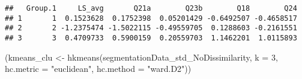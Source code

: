 \documentclass[
]{article}
\newenvironment{Shaded}{\begin{snugshade}}{\end{snugshade}}
\newcommand{\AttributeTok}[1]{\textcolor[rgb]{0.77,0.63,0.00}{#1}}
\newcommand{\DecValTok}[1]{\textcolor[rgb]{0.00,0.00,0.81}{#1}}
\newcommand{\FunctionTok}[1]{\textcolor[rgb]{0.00,0.00,0.00}{#1}}
\newcommand{\NormalTok}[1]{#1}
\newcommand{\OtherTok}[1]{\textcolor[rgb]{0.56,0.35,0.01}{#1}}
\newcommand{\StringTok}[1]{\textcolor[rgb]{0.31,0.60,0.02}{#1}}
\begin{document}
\begin{verbatim}
##   Group.1     LS_avg       Q21a        Q23b        Q18        Q24
## 1       1  0.1523628  0.1752398  0.05201429 -0.6492507 -0.4658517
## 2       2 -1.2375474 -1.5022115 -0.49559705  0.1288603 -0.2161551
## 3       3  0.4709733  0.5900159  0.20559703  1.1462201  1.0115893
\end{verbatim}

\begin{Shaded}
\begin{Highlighting}[]
\NormalTok{(kmeans\_clu }\OtherTok{\textless{}{-}} \FunctionTok{hkmeans}\NormalTok{(segmentationData\_std\_NoDissimilarity, }\AttributeTok{k =} \DecValTok{3}\NormalTok{, }\AttributeTok{hc.metric =} \StringTok{"euclidean"}\NormalTok{, }\AttributeTok{hc.method =} \StringTok{"ward.D2"}\NormalTok{))}
\end{Highlighting}
\end{Shaded}
\end{document}
